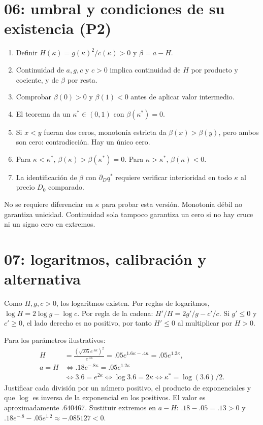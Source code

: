 \documentclass[11pt]{article}
\begin{document}
\section{06: umbral y condiciones de su existencia (P2)}
\begin{enumerate}
\item Definir $H(\kappa)=g(\kappa)^2/c(\kappa)>0$ y $\beta=a-H$.
\item Continuidad de $a,g,c$ y $c>0$ implica continuidad de $H$ por producto
y cociente, y de $\beta$ por resta.
\item Comprobar $\beta(0)>0$ y $\beta(1)<0$ antes de aplicar valor intermedio.
\item El teorema da un $\kappa^*\in(0,1)$ con $\beta(\kappa^*)=0$.
\item Si $x<y$ fueran dos ceros, monotonía estricta da $\beta(x)>\beta(y)$,
pero ambos son cero: contradicción. Hay un único cero.
\item Para $\kappa<\kappa^*$, $\beta(\kappa)>\beta(\kappa^*)=0$.
Para $\kappa>\kappa^*$, $\beta(\kappa)<0$.
\item La identificación de $\beta$ con $\partial_Dq^*$ requiere verificar
interioridad en todo $\kappa$ al precio $D_0$ comparado.
\end{enumerate}
No se requiere diferenciar en $\kappa$ para probar esta versión. Monotonía
débil no garantiza unicidad. Continuidad sola tampoco garantiza un cero si
no hay cruce ni un signo cero en extremos.

\section{07: logaritmos, calibración y alternativa}
Como $H,g,c>0$, los logaritmos existen. Por reglas de logaritmos,
$\log H=2\log g-\log c$. Por regla de la cadena:
$H'/H=2g'/g-c'/c$. Si $g'\le0$ y $c'\ge0$, el lado derecho es no positivo,
por tanto $H'\le0$ al multiplicar por $H>0$.

Para los parámetros ilustrativos:
\begin{align*}
H&=\frac{(\sqrt{.05}e^{.8\kappa})^2}{e^{.4\kappa}}
=.05e^{1.6\kappa-.4\kappa}=.05e^{1.2\kappa},\\
a=H&\iff .18e^{-.8\kappa}=.05e^{1.2\kappa}\\
&\iff 3.6=e^{2\kappa}\iff \log3.6=2\kappa
\iff \kappa^*=\log(3.6)/2.
\end{align*}
Justificar cada división por un número positivo, el producto de
exponenciales y que $\log$ es inversa de la exponencial en los positivos.
El valor es aproximadamente $.640467$. Sustituir extremos en $a-H$:
$.18-.05=.13>0$ y $.18e^{-.8}-.05e^{1.2}\approx-.085127<0$.
\end{document}
